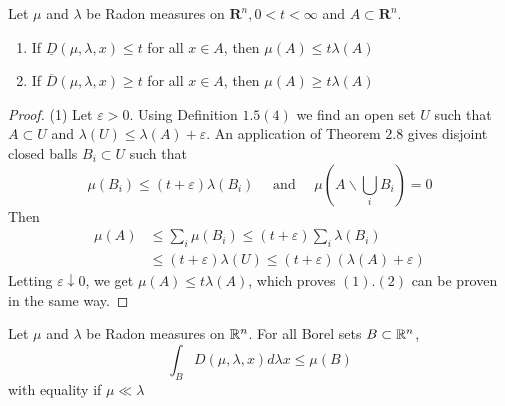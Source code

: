 \begin{lemma}
    Let $\mu$ and $\lambda$ be Radon measures on $\mathbf{R}^{n}, 0<t<\infty$ and $A \subset \mathbf{R}^{n}$.
    \begin{enumerate}[(1)]
        \item If $\underline{D}(\mu, \lambda, x) \leq t$ for all $x \in A$, then $\mu(A) \leq t \lambda(A)$
        \item If $\overline{D}(\mu, \lambda, x) \geq t$ for all $x \in A$, then $\mu(A) \geq t \lambda(A)$
    \end{enumerate}
\end{lemma}
\begin{proof}
    (1) Let $\varepsilon>0$. Using Definition $1.5(4)$ we find an open set $U$ such that $A \subset U$ and $\lambda(U) \leq \lambda(A)+\varepsilon .$ An application of Theorem $2.8$ gives disjoint closed balls $B_{i} \subset U$ such that
$$
\mu\left(B_{i}\right) \leq(t+\varepsilon) \lambda\left(B_{i}\right) \quad \text { and } \quad \mu\left(A \backslash \bigcup_{i} B_{i}\right)=0
$$
Then
$$
\begin{aligned}
\mu(A) & \leq \sum_{i} \mu\left(B_{i}\right) \leq(t+\varepsilon) \sum_{i} \lambda\left(B_{i}\right) \\
& \leq(t+\varepsilon) \lambda(U) \leq(t+\varepsilon)(\lambda(A)+\varepsilon)
\end{aligned}
$$
Letting $\varepsilon \downarrow 0$, we get $\mu(A) \leq t \lambda(A)$, which proves $(1) .(2)$ can be proven in the same way.
\end{proof}

\begin{theorem}
    Let $\mu$ and $\lambda$ be Radon measures on $\mathbb{R}^n$. For all Borel sets $B\subset \mathbb{R}^n$, 
    $$\int_{B} D(\mu, \lambda, x) d \lambda x \leq \mu(B)$$
    with equality if $\mu\ll\lambda$
\end{theorem}

